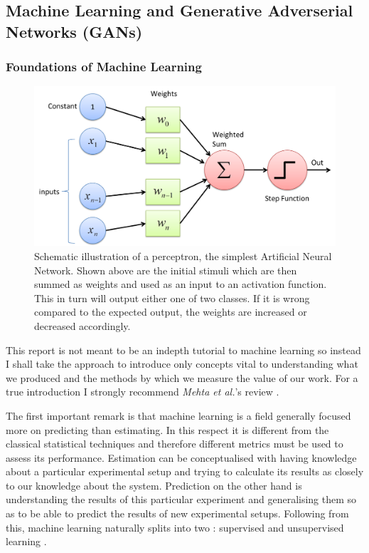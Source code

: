 \documentclass[11pt]{article} %
\begin{document}
\subsection{Machine Learning and Generative Adverserial Networks (GANs)}
\subsubsection{Foundations of Machine Learning}
\begin{figure}[H]
\centering
\includegraphics[scale=0.45]{images/perceptron-picture.png}
\caption{\cite{perceptron} Schematic illustration of a perceptron, the simplest Artificial Neural Network. Shown above are the initial stimuli which are then summed as weights and used as an input to an activation function.
This in turn will output either one of two classes. If it is wrong compared to the expected output, the weights are increased or decreased accordingly.}
\label{fig:perceptron}
\end{figure}
This report is not meant to be an indepth tutorial to machine learning so instead I shall take the approach to introduce only concepts vital to understanding what we produced and the methods by which we measure the value of our work. For a true introduction I strongly recommend \textit{Mehta et al.}'s review \cite{mehta2019high}.
\newline

The first important remark is that machine learning is a field generally focused more on predicting than estimating.
In this respect it is different from the classical statistical techniques and therefore different metrics must be used to assess its performance.
Estimation can be conceptualised with having knowledge about a particular experimental setup and trying to calculate its results as closely to our knowledge about the system.
Prediction on the other hand is understanding the results of this particular experiment and generalising them so as to be able to predict the results of new experimental setups.
Following from this, machine learning naturally splits into two : supervised and unsupervised learning \cite{Love2002}.
\newline
\end{document}
